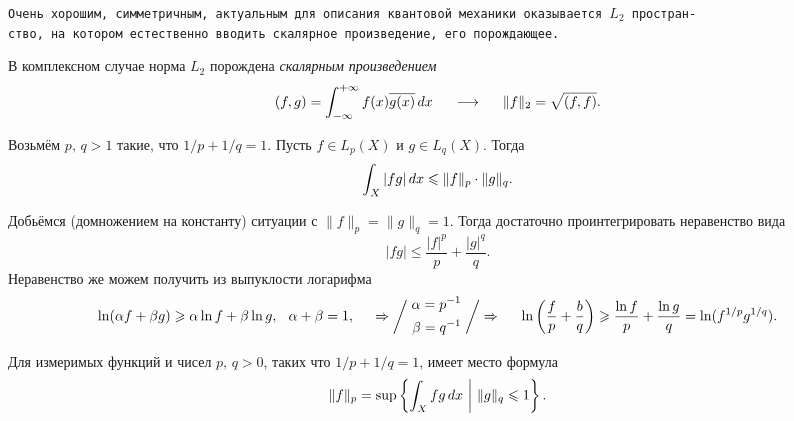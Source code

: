 \texttt{Очень хорошим, симметричным, актуальным для описания квантовой механики оказывается $L_2$ простран-\\ство, на котором естественно вводить скалярное произведение, его порождающее.} 

 \begin{to_def}
     В комплексном случае норма $L_2$ порождена \textit{скалярным произведением}
     \begin{equation*}
         (f, g) = \int_{-\infty}^{+\infty} f(x) \overline{g(x)} \d x
         \hspace{0.5cm} \longrightarrow \hspace{0.5cm}
         \|f\|_2 = \sqrt{(f, f)}.
     \end{equation*}
 \end{to_def}


\begin{to_thr}
    Возьмём $p, \, q > 1$ такие, что $1/p + 1/q = 1$. Пусть $f \in L_p (X)$ и $g \in L_q(X)$. Тогда
    \begin{equation*}
        \int_X |fg| \d x \leq \|f\|_p \cdot \|g\|_q.
    \end{equation*}
\end{to_thr}

\begin{uproof}
    Добьёмся (домножением на константу) ситуации с $\|f\|_p = \|g\|_q=1$. 
    Тогда достаточно проинтегрировать неравенство вида
    \begin{equation*}
        |fg| \leq \frac{|f|^p}{p} + \frac{|g|^q}{q}.
    \end{equation*}
    Неравенство же можем получить из выпуклости логарифма
    \begin{equation*}
        \ln(\alpha f + \beta g) \geq \alpha \ln f + \beta \ln g, \hspace{2.5 mm} \alpha + \beta = 1,
        \hspace{0.5cm} \Rightarrow  \bigg/ \left.\begin{aligned}
            \alpha = p^{-1} \\
            \beta = q^{-1}
        \end{aligned}\right. \bigg/ \Rightarrow\hspace{0.5cm}
        \ln\left(\frac{f}{p} + \frac{b}{q}\right) \geq \frac{\ln f}{p} + \frac{\ln g}{q} = \ln (f^{1/p} g^{1/q}).
    \end{equation*}
\end{uproof}

\begin{to_con}
    Для измеримых функций и чисел $p, \, q > 0$, таких что $1/p + 1/q = 1$, имеет место формула
    \begin{equation}
        \label{8_1}
        \|f\|_p = \sup \left\{
            \int_X fg \d x \ \bigg| \  \|g\|_q \leq 1
        \right\}.
    \end{equation}
\end{to_con}

